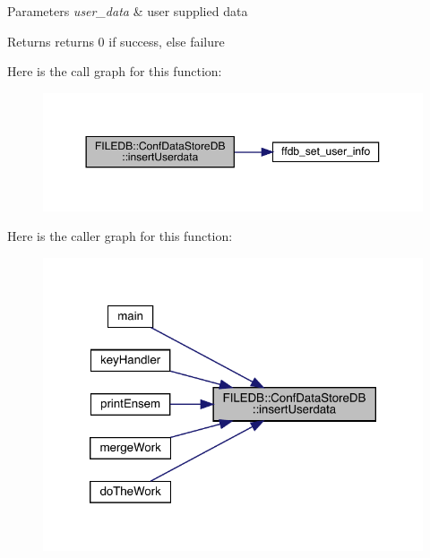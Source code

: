 \begin{DoxyParams}{Parameters}
{\em user\+\_\+data} & user supplied data \\
\hline
\end{DoxyParams}
\begin{DoxyReturn}{Returns}
returns 0 if success, else failure 
\end{DoxyReturn}
Here is the call graph for this function\+:
\nopagebreak
\begin{figure}[H]
\begin{center}
\leavevmode
\includegraphics[width=350pt]{d8/d19/classFILEDB_1_1ConfDataStoreDB_a8fa05198f3ff1f405fbdfc6a51f43d1a_cgraph}
\end{center}
\end{figure}
Here is the caller graph for this function\+:
\nopagebreak
\begin{figure}[H]
\begin{center}
\leavevmode
\includegraphics[width=320pt]{d8/d19/classFILEDB_1_1ConfDataStoreDB_a8fa05198f3ff1f405fbdfc6a51f43d1a_icgraph}
\end{center}
\end{figure}
\mbox{\label{classFILEDB_1_1ConfDataStoreDB_a8fa05198f3ff1f405fbdfc6a51f43d1a}} 
